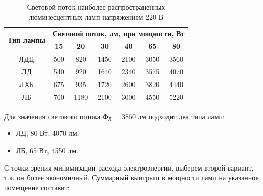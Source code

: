 \begin{enumerate}
  \begin{table}[!htbp]
    \centering
    \caption{Световой поток наиболее распространенных люминесцентных ламп напряжением 220 В}
      \begin{tabular}{|c|c|c|c|c|c|c|}
      \hline
      \multirow{2}[4]{*}{\textbf{Тип лампы}} & \multicolumn{6}{c|}{\textbf{Световой поток, лм, при мощности, Вт}} \\
\cline{2-7}         & \textbf{15} & \textbf{20} & \textbf{30} & \textbf{40} & \textbf{65} & \textbf{80} \\
      \hline
      ЛДЦ & 500 & 820 & 1450 & 2100 & 3050 & 3560 \\
      \hline
      ЛД & 540 & 920 & 1640 & 2340 & 3575 & 4070 \\
      \hline
      ЛХБ & 675 & 935 & 1720 & 2600 & 3820 & 4440 \\
      \hline
      ЛБ & 760 & 1180 & 2100 & 3000 & 4550 & 5220 \\
      \hline
      \end{tabular}
  \end{table}%


Для значения светового потока $Ф_Л = 3850 \;лм$ подходит два типа ламп:

\begin{itemize}
\item ЛД, 80 Вт, 4070 лм;
\item ЛБ, 65 Вт, 4550 лм.
\end{itemize}

С точки зрения минимизации расхода электроэнергии, выберем второй вариант, т.к. он более экономичный. Суммарный выигрыш в мощности ламп на указанное помещение составит:


\end{enumerate}
